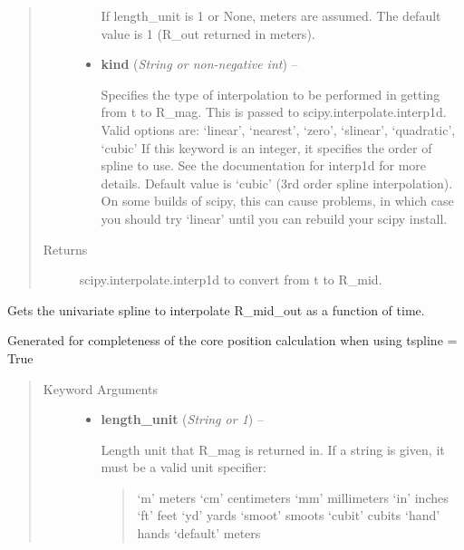 \documentclass[letterpaper,10pt,english]{sphinxmanual}
\begin{document}
\begin{fulllineitems}
\begin{fulllineitems}
\begin{quote}
\begin{description}
\begin{itemize}
If length\_unit is 1 or None, meters are assumed. The default
value is 1 (R\_out returned in meters).

\item {} 
\textbf{kind} (\emph{String or non-negative int}) --

Specifies the type of interpolation
to be performed in getting from t to R\_mag. This is
passed to scipy.interpolate.interp1d. Valid options are:
`linear', `nearest', `zero', `slinear', `quadratic', `cubic'
If this keyword is an integer, it specifies the order of spline
to use. See the documentation for interp1d for more details.
Default value is `cubic' (3rd order spline interpolation). On
some builds of scipy, this can cause problems, in which case
you should try `linear' until you can rebuild your scipy install.

\end{itemize}

\item[{Returns}] \leavevmode
scipy.interpolate.interp1d to convert from t to R\_mid.

\end{description}\end{quote}

\end{fulllineitems}


\begin{fulllineitems}
\label{eqtools:eqtools.core.Equilibrium.getRmidOutSpline}
Gets the univariate spline to interpolate R\_mid\_out as a function of time.

Generated for completeness of the core position calculation when using
tspline = True
\begin{quote}\begin{description}
\item[{Keyword Arguments}] \leavevmode\begin{itemize}
\item {} 
\textbf{length\_unit} (\emph{String or 1}) --

Length unit that R\_mag is returned in. If
a string is given, it must be a valid unit specifier:
\begin{quote}

`m'         meters
`cm'        centimeters
`mm'        millimeters
`in'        inches
`ft'        feet
`yd'        yards
`smoot'     smoots
`cubit'     cubits
`hand'      hands
`default'   meters
\end{quote}


\end{itemize}
\end{description}
\end{quote}
\end{fulllineitems}
\end{fulllineitems}
\end{document}

